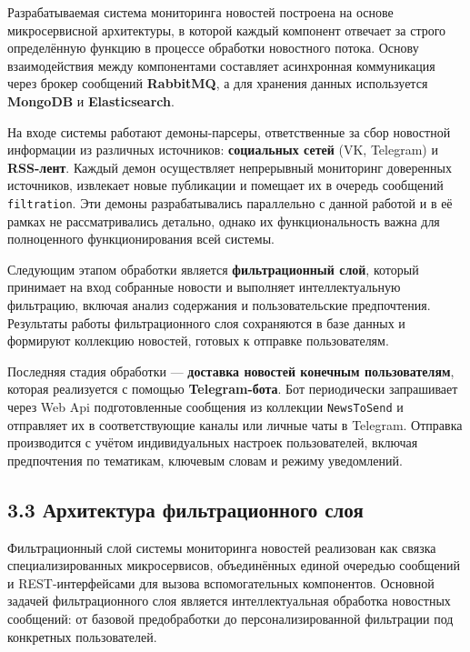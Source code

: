 Разрабатываемая система мониторинга новостей построена на основе
микросервисной архитектуры, в которой каждый компонент отвечает за
строго определённую функцию в процессе обработки новостного потока.
Основу взаимодействия между компонентами составляет асинхронная
коммуникация через брокер сообщений \textbf{RabbitMQ}, а для хранения
данных используется \textbf{MongoDB} и \textbf{Elasticsearch}.

На входе системы работают демоны-парсеры, ответственные за сбор
новостной информации из различных источников: \textbf{социальных сетей}
(VK, Telegram) и \textbf{RSS-лент}. Каждый демон осуществляет
непрерывный мониторинг доверенных источников, извлекает новые публикации
и помещает их в очередь сообщений \texttt{filtration}. Эти демоны
разрабатывались параллельно с данной работой и в её рамках не
рассматривались детально, однако их функциональность важна для
полноценного функционирования всей системы.

Следующим этапом обработки является \textbf{фильтрационный слой},
который принимает на вход собранные новости и выполняет интеллектуальную
фильтрацию, включая анализ содержания и пользовательские предпочтения.
Результаты работы фильтрационного слоя сохраняются в базе данных и
формируют коллекцию новостей, готовых к отправке пользователям.

Последняя стадия обработки --- \textbf{доставка новостей конечным
пользователям}, которая реализуется с помощью \textbf{Telegram-бота}.
Бот периодически запрашивает через Web Api подготовленные сообщения из
коллекции \texttt{NewsToSend} и отправляет их в соответствующие каналы
или личные чаты в Telegram. Отправка производится с учётом
индивидуальных настроек пользователей, включая предпочтения по
тематикам, ключевым словам и режиму уведомлений.

\hypertarget{ux430ux440ux445ux438ux442ux435ux43aux442ux443ux440ux430-ux444ux438ux43bux44cux442ux440ux430ux446ux438ux43eux43dux43dux43eux433ux43e-ux441ux43bux43eux44f}{%
\subsection{3.3 Архитектура фильтрационного
слоя}\label{ux430ux440ux445ux438ux442ux435ux43aux442ux443ux440ux430-ux444ux438ux43bux44cux442ux440ux430ux446ux438ux43eux43dux43dux43eux433ux43e-ux441ux43bux43eux44f}}

Фильтрационный слой системы мониторинга новостей реализован как связка
специализированных микросервисов, объединённых единой очередью сообщений
и REST-интерфейсами для вызова вспомогательных компонентов. Основной
задачей фильтрационного слоя является интеллектуальная обработка
новостных сообщений: от базовой предобработки до персонализированной
фильтрации под конкретных пользователей.

